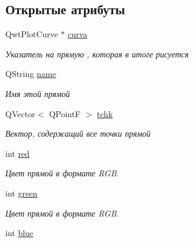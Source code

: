 \subsection*{Открытые атрибуты}
\begin{DoxyCompactItemize}
\item 
Qwt\+Plot\+Curve $\ast$ \hyperlink{classgraph_abbfdc5f6022afe7be261bf927498e92e}{curva}\hypertarget{classgraph_abbfdc5f6022afe7be261bf927498e92e}{}\label{classgraph_abbfdc5f6022afe7be261bf927498e92e}

\begin{DoxyCompactList}\small\item\em Указатель на прямую , которая в итоге рисуется \end{DoxyCompactList}\item 
Q\+String \hyperlink{classgraph_abfbbdbd09b20d6ef147ee966b1325595}{name}\hypertarget{classgraph_abfbbdbd09b20d6ef147ee966b1325595}{}\label{classgraph_abfbbdbd09b20d6ef147ee966b1325595}

\begin{DoxyCompactList}\small\item\em Имя этой прямой \end{DoxyCompactList}\item 
Q\+Vector$<$ Q\+PointF $>$ \hyperlink{classgraph_afae7c6852c8de983693fb2fd108ed3c4}{tchk}\hypertarget{classgraph_afae7c6852c8de983693fb2fd108ed3c4}{}\label{classgraph_afae7c6852c8de983693fb2fd108ed3c4}

\begin{DoxyCompactList}\small\item\em Вектор, содержащий все точки прямой \end{DoxyCompactList}\item 
int \hyperlink{classgraph_aa3334acd551b2fc61901c2afdd4b2d8f}{red}\hypertarget{classgraph_aa3334acd551b2fc61901c2afdd4b2d8f}{}\label{classgraph_aa3334acd551b2fc61901c2afdd4b2d8f}

\begin{DoxyCompactList}\small\item\em Цвет прямой в формате R\+GB. \end{DoxyCompactList}\item 
int \hyperlink{classgraph_abb30b4156f98b6e0046f7192c389e4e4}{green}\hypertarget{classgraph_abb30b4156f98b6e0046f7192c389e4e4}{}\label{classgraph_abb30b4156f98b6e0046f7192c389e4e4}

\begin{DoxyCompactList}\small\item\em Цвет прямой в формате R\+GB. \end{DoxyCompactList}\item 
int \hyperlink{classgraph_a2007891f138555cc8be9ca822b9fa2db}{blue}\hypertarget{classgraph_a2007891f138555cc8be9ca822b9fa2db}{}\label{classgraph_a2007891f138555cc8be9ca822b9fa2db}


\end{DoxyCompactItemize}
